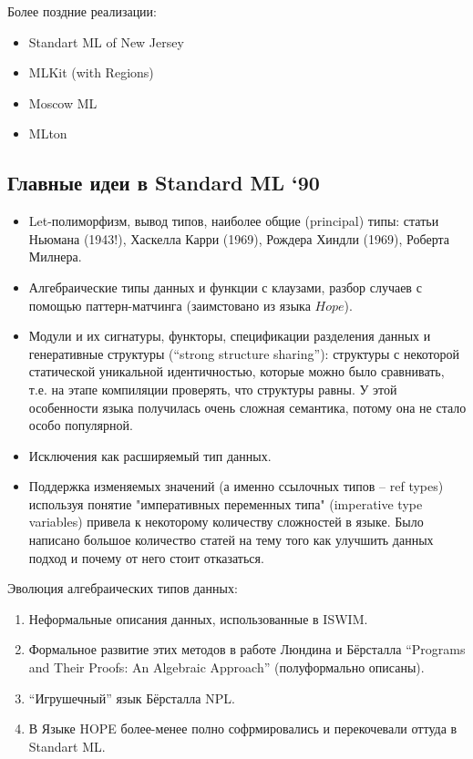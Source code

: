 \documentclass[14pt]{matmex-diploma-custom}
\begin{document}
Более поздние реализации:
\begin{itemize}
 \item Standart ML of New Jersey
 \item MLKit (with Regions)
 \item Moscow ML
 \item MLton
\end{itemize}

\subsection{Главные идеи в  Standard ML ‘90}
\begin{itemize}
\item Let-полиморфизм, вывод типов, наиболее общие (principal) типы: статьи Ньюмана (1943!), Хаскелла Карри (1969), Рождера Хиндли (1969), Роберта Милнера.
\item Алгебраические типы данных и функции с клаузами, разбор случаев с помощью паттерн-матчинга (заимстовано из языка $Hope$).
\item Модули и их сигнатуры, функторы, спецификации разделения данных и генеративные структуры (“strong structure sharing”): структуры  с  некоторой статической уникальной идентичностью, которые  можно было сравнивать, т.е. на этапе компиляции проверять, что структуры равны. У этой особенности языка получилась очень сложная семантика, потому она не стало особо популярной.
\item Исключения как расширяемый тип данных.
\item Поддержка изменяемых значений (а именно ссылочных типов -- ref types) используя  понятие "императивных переменных типа" (imperative type variables) привела к некоторому количеству сложностей в языке. Было написано большое количество статей на тему того как улучшить данных подход и почему от него стоит отказаться.
\end{itemize}

Эволюция алгебраических типов данных:
\begin{enumerate}
\item Неформальные описания данных, использованные в ISWIM.
\item Формальное развитие этих методов в работе Люндина и Бёрсталла “Programs and Their Proofs: An Algebraic Approach” (полуформально описаны).
\item “Игрушечный” язык Бёрсталла NPL.
\item В Языке HOPE более-менее полно софрмировались и перекочевали оттуда в Standart ML.
\end{enumerate}
\end{document}
